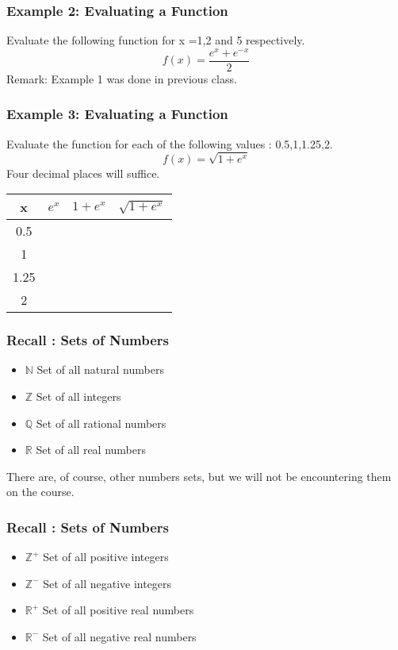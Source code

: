 \documentclass{beamer}
\begin{document}
\begin{frame}
	\frametitle{Example 2: Evaluating a Function}
	Evaluate the following function for x =1,2 and 5 respectively.
	{
		\Large
	\[ f(x) = \frac{e^x + {e^{-x}}}{2} \]
}
	Remark:  Example 1 was done in previous class.
\end{frame}
\begin{frame}
	
	\frametitle{Example 3: Evaluating a Function}
	Evaluate the function for each of the following values : 0.5,1,1.25,2.
	{
		\Large
	\[f(x) =  \sqrt{1+e^{x}}  \]
}
	Four decimal places will suffice.
\end{frame}
\begin{frame}
	\begin{center}
		\begin{tabular}{|c|c|c|c|}
			\hline \rule[-2ex]{0pt}{5.5ex} x & $e^x$ & $1+e^x$ & $\sqrt{1+e^x}$ \\ \hline
			\hline \rule[-2ex]{0pt}{5.5ex} 0.5 & \phantom{space}  &  &  \\ 
			\hline \rule[-2ex]{0pt}{5.5ex} 1 &  &  &  \\ 
			\hline \rule[-2ex]{0pt}{5.5ex} 1.25 & \phantom{space}  &  &  \\ 
			\hline \rule[-2ex]{0pt}{5.5ex} 2 & \phantom{space}  &  & \phantom{space}  \\ 
			\hline 
		\end{tabular} 
	\end{center}
\end{frame}
\begin{frame}
	\frametitle{Recall : Sets of Numbers}
	\begin{itemize} 
		\item $\mathbb{N}$ Set of all natural numbers
		\item $\mathbb{Z}$ Set of all integers
		\item $\mathbb{Q}$ Set of all rational numbers
		\item $\mathbb{R}$ Set of all real numbers
	\end{itemize}
	
	\bigskip There are, of course, other numbers sets, but we will not be encountering them on the course.
\end{frame}

\begin{frame}
	\frametitle{Recall : Sets of Numbers}
	\begin{itemize}
		\item $\mathbb{Z}^{+}$ Set of all positive integers
		\item $\mathbb{Z}^{-}$ Set of all negative integers
		\item $\mathbb{R}^{+}$ Set of all positive real numbers
		\item $\mathbb{R}^{-}$ Set of all negative real numbers
	\end{itemize}
\end{frame}
\end{document}
